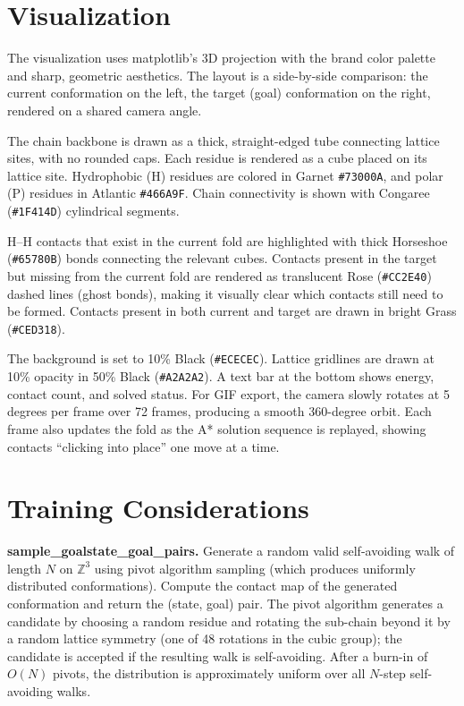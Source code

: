 \documentclass[11pt]{article}
\begin{document}
\section{Visualization}

The visualization uses matplotlib's 3D projection with the brand color palette and sharp, geometric aesthetics. The layout is a side-by-side comparison: the current conformation on the left, the target (goal) conformation on the right, rendered on a shared camera angle.

The chain backbone is drawn as a thick, straight-edged tube connecting lattice sites, with no rounded caps. Each residue is rendered as a cube placed on its lattice site. Hydrophobic (H) residues are colored in \textcolor{garnet}{Garnet \texttt{\#73000A}}, and polar (P) residues in \textcolor{atlantic}{Atlantic \texttt{\#466A9F}}. Chain connectivity is shown with Congaree (\texttt{\#1F414D}) cylindrical segments.

H--H contacts that exist in the current fold are highlighted with thick Horseshoe (\texttt{\#65780B}) bonds connecting the relevant cubes. Contacts present in the target but missing from the current fold are rendered as translucent Rose (\texttt{\#CC2E40}) dashed lines (ghost bonds), making it visually clear which contacts still need to be formed. Contacts present in both current and target are drawn in bright Grass (\texttt{\#CED318}).

The background is set to 10\% Black (\texttt{\#ECECEC}). Lattice gridlines are drawn at 10\% opacity in 50\% Black (\texttt{\#A2A2A2}). A text bar at the bottom shows energy, contact count, and solved status. For GIF export, the camera slowly rotates at 5 degrees per frame over 72 frames, producing a smooth 360-degree orbit. Each frame also updates the fold as the A* solution sequence is replayed, showing contacts ``clicking into place'' one move at a time.


\section{Training Considerations}

\textbf{sample\_goalstate\_goal\_pairs.} Generate a random valid self-avoiding walk of length $N$ on $\mathbb{Z}^3$ using pivot algorithm sampling (which produces uniformly distributed conformations). Compute the contact map of the generated conformation and return the (state, goal) pair. The pivot algorithm generates a candidate by choosing a random residue and rotating the sub-chain beyond it by a random lattice symmetry (one of 48 rotations in the cubic group); the candidate is accepted if the resulting walk is self-avoiding. After a burn-in of $O(N)$ pivots, the distribution is approximately uniform over all $N$-step self-avoiding walks.
\end{document}
